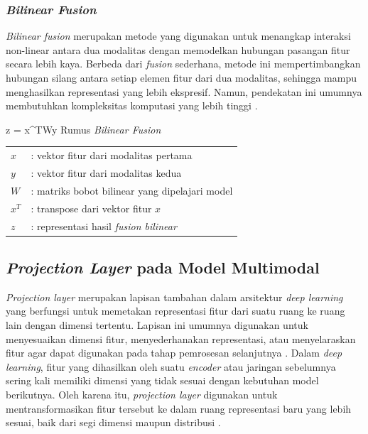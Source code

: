 \subsubsection{\textit{Bilinear Fusion}}
\textit{Bilinear fusion} merupakan metode yang digunakan untuk menangkap interaksi non-linear antara dua modalitas dengan memodelkan hubungan pasangan fitur secara lebih kaya. Berbeda dari \textit{fusion} sederhana, metode ini mempertimbangkan hubungan silang antara setiap elemen fitur dari dua modalitas, sehingga mampu menghasilkan representasi yang lebih ekspresif. Namun, pendekatan ini umumnya membutuhkan kompleksitas komputasi yang lebih tinggi \cite{fukui2016multimodal}.

\begin{equationcaptioned}{
	z = x^{T}Wy
}{
	Rumus \textit{Bilinear Fusion}
}
\end{equationcaptioned}

\noindent
{}

\begin{tabular}{l l}
$x$ & : vektor fitur dari modalitas pertama \\
$y$ & : vektor fitur dari modalitas kedua \\
$W$ & : matriks bobot bilinear yang dipelajari model \\
$x^{T}$ & : transpose dari vektor fitur $x$ \\
$z$ & : representasi hasil \textit{fusion bilinear} \\
\end{tabular}


\subsection{\textit{Projection Layer} pada Model Multimodal} \label{II.teori8.6}
\textit{Projection layer} merupakan lapisan tambahan dalam arsitektur \textit{deep learning} yang berfungsi untuk memetakan representasi fitur dari suatu ruang ke ruang lain dengan dimensi tertentu. Lapisan ini umumnya digunakan untuk menyesuaikan dimensi fitur, menyederhanakan representasi, atau menyelaraskan fitur agar dapat digunakan pada tahap pemrosesan selanjutnya \cite{articleheaton2017}. Dalam \textit{deep learning}, fitur yang dihasilkan oleh suatu \textit{encoder} atau jaringan sebelumnya sering kali memiliki dimensi yang tidak sesuai dengan kebutuhan model berikutnya. Oleh karena itu, \textit{projection layer} digunakan untuk mentransformasikan fitur tersebut ke dalam ruang representasi baru yang lebih sesuai, baik dari segi dimensi maupun distribusi \cite{inbookbishop2006}.

